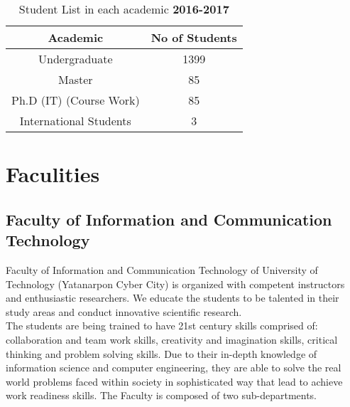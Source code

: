 \documentclass[conference]{IEEEtran}
\begin{document}
\begin{table}[h!]
\caption{\label{table:RawangKachinCM} Student List in each academic \bf{2016-2017}}

\begin{center}
\begin{tabular}{ |c|c| } 
 \hline
 \bf Academic & \bf No of Students \\ [5pt]
 \hline
 Undergraduate  & 1399 \\[5pt]
 \hline
 Master  & 85 \\[5pt]
 \hline
 Ph.D (IT) (Course Work) & 85 \\[5pt]
 \hline
 International Students  & 3 \\[5pt]
 \hline
\end{tabular}
\end{center}
\end{table}

\section{Faculities}
\subsection{Faculty of Information and Communication Technology}
Faculty of Information and Communication Technology of University of Technology (Yatanarpon Cyber City) is organized with competent instructors and enthusiastic researchers. We educate the students to be talented in their study areas and conduct innovative scientific research.\\
The students are being trained to have 21st century skills comprised of: collaboration and team work skills, creativity and imagination skills, critical thinking and problem solving skills. Due to their in-depth knowledge of information science and computer engineering, they are able to solve the real world problems faced within society in sophisticated way that lead to achieve work readiness skills. The Faculty is composed of two sub-departments.
\end{document}

